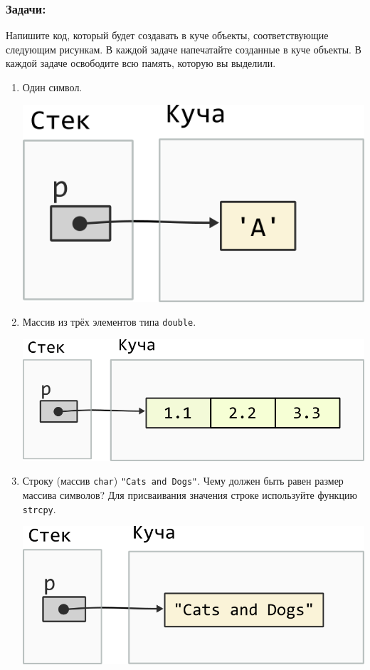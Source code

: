 \documentclass{article}
\begin{document}
\newpage
\subsubsection*{Задачи:}

Напишите код, который будет создавать в куче объекты, соответствующие следующим рисункам. В каждой задаче напечатайте созданные в куче объекты. В каждой задаче освободите всю память, которую вы выделили.
\begin{enumerate}
\item Один символ.
\begin{center}
\includegraphics[scale=0.72]{../images/malloc_class_tasks/heap_char.png}
\end{center}


\item Массив из трёх элементов типа \texttt{double}.
\begin{center}
\includegraphics[scale=0.72]{../images/malloc_class_tasks/heap_double_array.png}
\end{center}

\item Строку (массив \texttt{char}) \texttt{"Cats and Dogs"}. Чему должен быть равен размер массива символов? Для присваивания значения строке используйте функцию \texttt{strcpy}.
\begin{center}
\includegraphics[scale=0.72]{../images/malloc_class_tasks/heap_char_array.png}
\end{center}



\end{enumerate}
\end{document}
